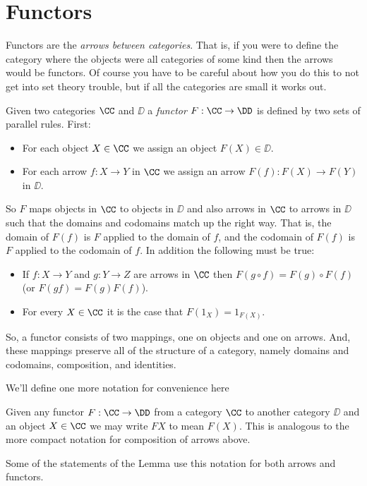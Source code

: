 \section{Functors}

Functors are the {\it arrows between categories}. That is, if you were to define the
category where the objects were all categories of some kind then the arrows would be
functors. Of course you have to be careful about how you do this to not get into set
theory trouble, but if all the categories are small it works out.

\goodbreak
\begin{defn}
Given two categories $\CC$ and $\DD$ a {\it functor} $F : \CC \to \DD$ is defined by two
sets of parallel rules. First:
\begin{itemize}
\item For each object $X \in \CC$ we assign an object $F(X) \in \DD$.
\item For each arrow $f: X \to Y$ in $\CC$ we assign an arrow $F(f): F(X) \to F(Y)$ in
$\DD$.
\end{itemize}
\noindent
So $F$ maps objects in $\CC$ to objects in $\DD$ and also arrows in $\CC$ to arrows in
$\DD$ such that the domains and codomains match up the right way. That is, the domain of
$F(f)$ is $F$ applied to the domain of $f$, and the codomain of $F(f)$ is $F$ applied to
the codomain of $f$. In addition the following must be true:
\begin{itemize}
\item If $f:X \to Y$ and $g: Y \to Z$ are arrows in $\CC$ then $F(g \circ f) = F(g) \circ
F(f)$ (or $F(gf) = F(g)F(f)$).
\item For every $X \in \CC$ it is the case that $F(1_X) = 1_{F(X)}$.
\end{itemize}

\end{defn}
\noindent
So, a functor consists of two mappings, one on objects and one on arrows. And, these
mappings preserve all of the structure of a category, namely domains and codomains,
composition, and identities.

We'll define one more notation for convenience here

\begin{defn}
Given any functor $F: \CC \to \DD$ from a category $\CC$ to another category $\DD$ and an
object $X \in \CC$ we may write $F X$ to mean $F(X)$. This is analogous to the more
compact notation for composition of arrows above.
\end{defn}
\noindent
Some of the statements of the Lemma use this notation for both arrows and functors.


